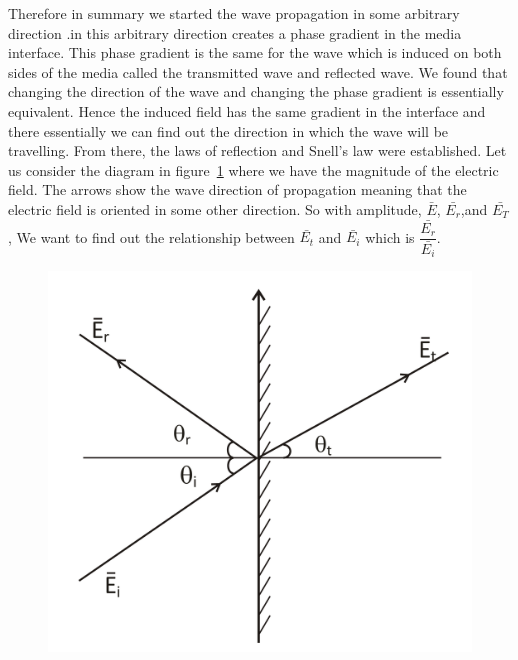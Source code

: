 Therefore in summary we started the wave propagation in some arbitrary direction .in this arbitrary direction creates a phase gradient in the media interface. This phase gradient is the same for the wave which is induced on both sides of the media called the transmitted wave and reflected wave. We found that changing the direction of the wave and changing the phase gradient is essentially equivalent. Hence the induced field has the same gradient in the interface and there essentially we can find out the direction in which the wave will be travelling. From there, the laws of reflection and Snell's law were established. Let us consider the diagram in figure~\ref{fig:group30f} where we have the magnitude of the electric field. The arrows show the wave direction of propagation meaning that the electric field is oriented in some other direction. So with amplitude, $\bar{E}$, $\bar{E_r}$,and $\bar{E_T}$, We want to find out the relationship between $\bar{E_t}$ and $\bar{E_i}$ which is $\dfrac{\bar{E_r}}{\bar{E_i}}$.
\begin{figure}[h]
\centering
\includegraphics[width=.7\linewidth]{./graphics/group30f}
\caption{}
\label{fig:group30f}
\end{figure}


